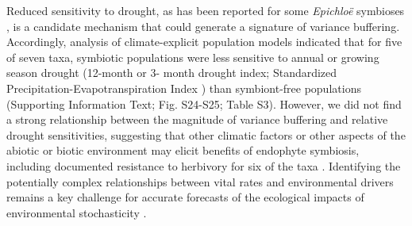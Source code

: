 \documentclass[9pt,twocolumn,twoside]{pnas-new}
\begin{document}
Reduced sensitivity to drought, as has been reported for some \emph{Epichlo\"{e}} symbioses \cite{decunta2021systematic}, is a candidate mechanism that could generate a signature of variance buffering.
Accordingly, analysis of climate-explicit population models indicated that for five of seven taxa, symbiotic populations were less sensitive to annual or growing season drought (12-month or 3- month drought index; Standardized Precipitation-Evapotranspiration Index \cite{vicente2010multiscalar}) than symbiont-free populations (Supporting Information Text; Fig. S24-S25; Table S3).
However, we did not find a strong relationship between the magnitude of variance buffering and relative drought sensitivities, suggesting that other climatic factors or other aspects of the abiotic or biotic environment may elicit benefits of endophyte symbiosis, including documented resistance to herbivory for six of the taxa \cite{rudgers2008invasive,crawford2010fungal}.
Identifying the potentially complex relationships between vital rates and environmental drivers remains a key challenge for accurate forecasts of the ecological impacts of environmental stochasticity \cite{ehrlen2015predicting}.
\end{document}
